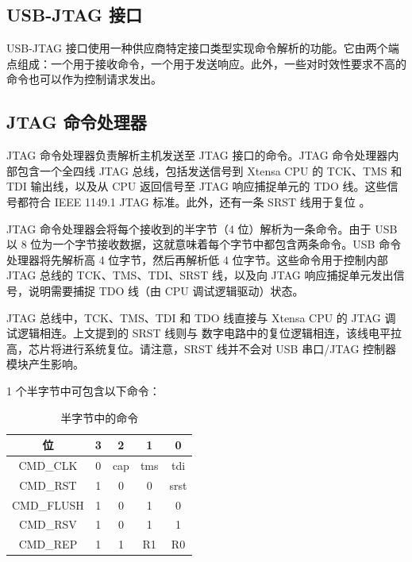 \documentclass[main\_\_CN.tex]{subfiles}
\begin{document}
\subsection{USB-JTAG 接口}

USB-JTAG 接口使用一种供应商特定接口类型实现命令解析的功能。它由两个端点组成：一个用于接收命令，一个用于发送响应。此外，一些对时效性要求不高的命令也可以作为控制请求发出。

\subsection{JTAG 命令处理器}

JTAG 命令处理器负责解析主机发送至 JTAG 接口的命令。JTAG 命令处理器内部包含一个全四线 JTAG 总线，包括发送信号到 Xtensa CPU 的 TCK、TMS 和 TDI 输出线，以及从 CPU 返回信号至 JTAG 响应捕捉单元的 TDO 线。这些信号都符合 IEEE 1149.1 JTAG 标准。此外，还有一条 SRST 线用于复位 \chipname{}。

JTAG 命令处理器会将每个接收到的半字节（4 位）解析为一条命令。由于 USB 以 8 位为一个字节接收数据，这就意味着每个字节中都包含两条命令。USB 命令处理器将先解析高 4 位字节，然后再解析低 4 位字节。这些命令用于控制内部 JTAG 总线的 TCK、TMS、TDI、SRST 线，以及向 JTAG 响应捕捉单元发出信号，说明需要捕捉 TDO 线（由 CPU 调试逻辑驱动）状态。

JTAG 总线中，TCK、TMS、TDI 和 TDO 线直接与 Xtensa CPU 的 JTAG 调试逻辑相连。上文提到的 SRST 线则与 \chipname{} 数字电路中的复位逻辑相连，该线电平拉高，芯片将进行系统复位。请注意，SRST 线并不会对 USB 串口/JTAG 控制器模块产生影响。

1 个半字节中可包含以下命令：

\begin{table}[H]
    \centering
    \caption{半字节中的命令}
    \label{tab:usbserialjtag-commands-of-a-nibble}

    \begin{tabular}{|c|c c c c|}
    \hline
        \rowcolor{lightgray}
        \textbf{位} & \textbf{3} & \textbf{2} & \textbf{1} & \textbf{0}
        \\\hline

        CMD\_CLK & 0 &  cap & tms & tdi \\\hline
        CMD\_RST & 1 & 0 & 0 & srst \\\hline
        CMD\_FLUSH & 1 & 0 & 1 & 0 \\\hline
        CMD\_RSV & 1 & 0 & 1 & 1 \\\hline
        CMD\_REP & 1 & 1 & R1 & R0 \\\hline
    \end{tabular}
\end{table}
\end{document}

